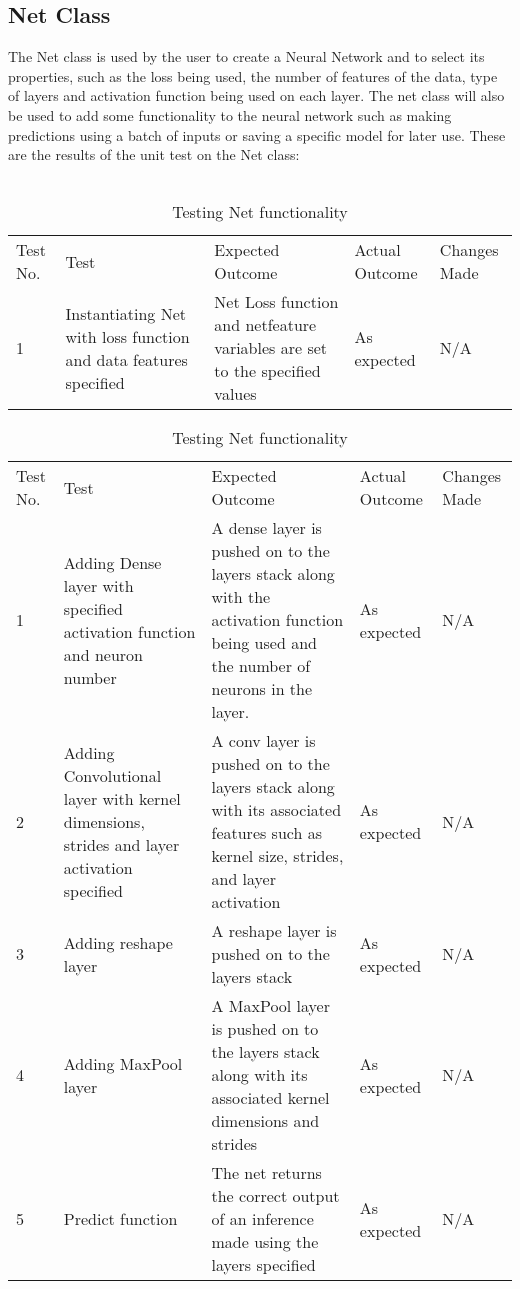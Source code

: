 \subsection{Net Class}
The Net class is used by the user to create a Neural Network and to select its properties, such as the loss being used, the number of features of the data, type of layers and activation function being used on each layer. The net class will also be used to add some functionality to the neural network such as making predictions using a batch of inputs or saving a specific model for later use. These are the results of the unit test on the Net class: 
\\ \\
\begin{table}[H]
\centering
    \begin{tabular}{|p{1cm}|p{4cm}|p{4cm}|p{3cm}|p{2cm}|}
        \hline
        Test No. & Test & Expected Outcome & Actual Outcome & Changes Made \\ \cline{1-5} 
        1 & Instantiating Net with loss function and data features specified & Net Loss function and netfeature variables are set to the specified values & As expected & N/A \\
        \cline{1-5}
    \end{tabular}
    \caption{Testing Net Constructors}
    \vspace{0.5cm}

    \begin{tabular}{|p{1cm}|p{4cm}|p{4cm}|p{3cm}|p{2cm}|}
        \hline
        Test No. & Test & Expected Outcome & Actual Outcome & Changes Made \\ \cline{1-5} 
        1 & Adding Dense layer with specified activation function and neuron number & A dense layer is pushed on to the layers stack along with the activation function being used and the number of neurons in the layer. & As expected & N/A \\ \cline{1-5}
        2 & Adding Convolutional layer with kernel dimensions, strides and layer activation specified & A conv layer is pushed on to the layers stack along with its associated features such as kernel size, strides, and layer activation & As expected & N/A \\ \cline{1-5}
        3 & Adding reshape layer & A reshape layer is pushed on to the layers stack & As expected & N/A \\ \cline{1-5}
        4 & Adding MaxPool layer & A MaxPool layer is pushed on to the layers stack along with its associated kernel dimensions and strides & As expected & N/A \\ \cline{1-5}        
        5 & Predict function & The net returns the correct output of an inference made using the layers specified & As expected & N/A \\ \cline{1-5}
    \end{tabular}
    \caption{Testing Net functionality}
\end{table}
